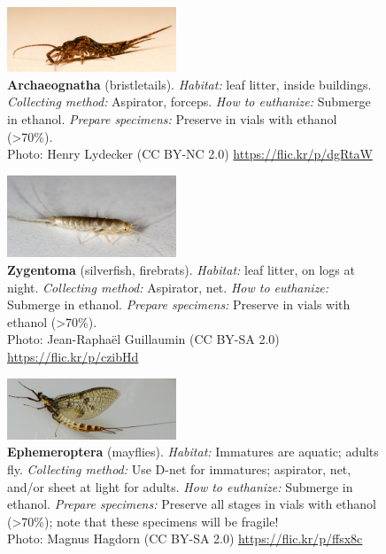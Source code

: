 \documentclass[letterpaper, 11pt]{article}
\begin{document}
\begin{figure}
  \caption{\textbf{Archaeognatha} (bristletails). \textit{Habitat:} leaf litter, inside buildings. \textit{Collecting method:} Aspirator, forceps. \textit{How to euthanize:} Submerge in ethanol. \textit{Prepare specimens:} Preserve in vials with ethanol (\textgreater70\%).\\ Photo: Henry Lydecker (CC BY-NC 2.0) \url{https://flic.kr/p/dgRtaW}}
  \includegraphics[width=0.45\textwidth]{Archeognatha}
\end{figure}

\begin{figure}
  \caption{\textbf{Zygentoma} (silverfish, firebrats). \textit{Habitat:} leaf litter, on logs at night. \textit{Collecting method:} Aspirator, net. \textit{How to euthanize:} Submerge in ethanol. \textit{Prepare specimens:} Preserve in vials with ethanol (\textgreater70\%).\\ Photo: Jean-Rapha\"{e}l Guillaumin (CC BY-SA 2.0) \url{https://flic.kr/p/czibHd}}
  \includegraphics[width=0.45\textwidth]{Zygentoma}
\end{figure}

\begin{figure}
  \caption{\textbf{Ephemeroptera} (mayflies). \textit{Habitat:} Immatures are aquatic; adults fly. \textit{Collecting method:} Use D-net for immatures; aspirator, net, and/or sheet at light for adults. \textit{How to euthanize:} Submerge in ethanol. \textit{Prepare specimens:} Preserve all stages in vials with ethanol (\textgreater70\%); note that these specimens will be fragile!\\ Photo: Magnus Hagdorn (CC BY-SA 2.0) \url{https://flic.kr/p/ffsx8c}}
  \includegraphics[width=0.45\textwidth]{Ephemeroptera}
\end{figure}
\end{document}
